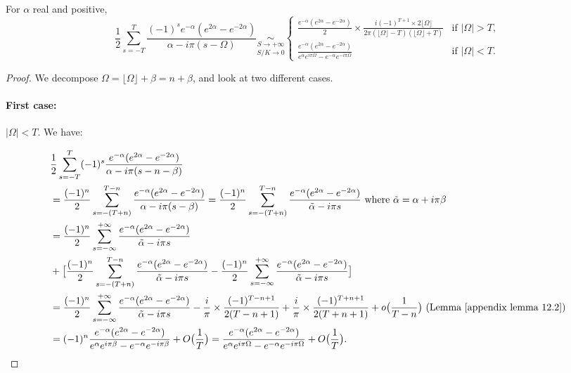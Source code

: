 \begin{lemma}\label{appendix lemma 12.4}
For $\alpha$ real and positive, 
\[
\frac{1}{2}\sum_{s=-T}^T\frac{(-1)^se^{-\alpha}(e^{2\alpha}-e^{-2\alpha})}{\alpha - i\pi(s-\Omega)} \underset{S/K\rightarrow 0}{\underset{S\rightarrow+\infty}{\sim} }
\begin{cases}
    \frac{e^{-\alpha}(e^{2\alpha}-e^{-2\alpha})}{2}\times\frac{i(-1)^{T+1}\times 2\lfloor\Omega\rfloor}{2\pi(\lfloor\Omega\rfloor-T)(\lfloor\Omega\rfloor+T)} & \text{if } \vert\Omega\vert > T, \\
\frac{e^{-\alpha}(e^{2\alpha}-e^{-2\alpha})}{e^{\alpha}e^{i\pi\Omega}-e^{-\alpha}e^{-i\pi\Omega}} & \text{if } \vert\Omega\vert < T.
\end{cases}
\] 
\end{lemma}

\begin{proof}
    We decompose $\Omega = \lfloor\Omega\rfloor + \beta = n + \beta$, and look at two different cases.
    
    \paragraph{First case:}$\vert\Omega\vert < T$. We have:
    
\begin{align*}
        &\frac{1}{2}\sum_{s=-T}^T(-1)^s\frac{e^{-\alpha}(e^{2\alpha}-e^{-2\alpha})}{\alpha - i\pi(s-n-\beta)}\\
        &=\frac{(-1)^n}{2}\sum_{s=-(T+n)}^{T-n}\frac{e^{-\alpha}(e^{2\alpha}-e^{-2\alpha})}{\alpha - i\pi(s-\beta)} =\frac{(-1)^n}{2}\sum_{s=-(T+n)}^{T-n}\frac{e^{-\alpha}(e^{2\alpha}-e^{-2\alpha})}{\tilde{\alpha} - i\pi s} \text{ where }\tilde{\alpha} = \alpha+i\pi\beta\\
        &=\frac{(-1)^n}{2}\sum_{s=-\infty}^{+\infty}\frac{e^{-\alpha}(e^{2\alpha}-e^{-2\alpha})}{\tilde{\alpha}-i\pi s}\\
        &+ \big[\frac{(-1)^n}{2}\sum_{s=-(T+n)}^{T-n}\frac{e^{-\alpha}(e^{2\alpha}-e^{-2\alpha})}{\tilde{\alpha}-i\pi s} -  \frac{(-1)^n}{2}\sum_{s=-\infty}^{+\infty}\frac{e^{-\alpha}(e^{2\alpha}-e^{-2\alpha})}{\tilde{\alpha}-i\pi s}\big]\\
        &=\frac{(-1)^n}{2}\sum_{s=-\infty}^{+\infty}\frac{e^{-\alpha}(e^{2\alpha}-e^{-2\alpha})}{\tilde{\alpha}-i\pi s} -\frac{i}{\pi}\times\frac{(-1)^{T-n+1}}{2(T-n+1)} + \frac{i}{\pi}\times\frac{(-1)^{T+n+1}}{2(T+n+1)} + o\big(\frac{1}{T-n}\big) \text{ (Lemma~\ref{appendix lemma 12.2})}\\
        &= (-1)^n\frac{e^{-\alpha}(e^{2\alpha}-e^{-2\alpha})}{e^{\alpha}e^{i\pi\beta} - e^{-\alpha}e^{-i\pi\beta}} + O\big(\frac{1}{{T}}\big) = \frac{e^{-\alpha}(e^{2\alpha}-e^{-2\alpha})}{e^{\alpha}e^{i\pi\Omega} - e^{-\alpha}e^{-i\pi\Omega}} +  O\big(\frac{1}{{T}}\big).
\end{align*}


\end{proof}
